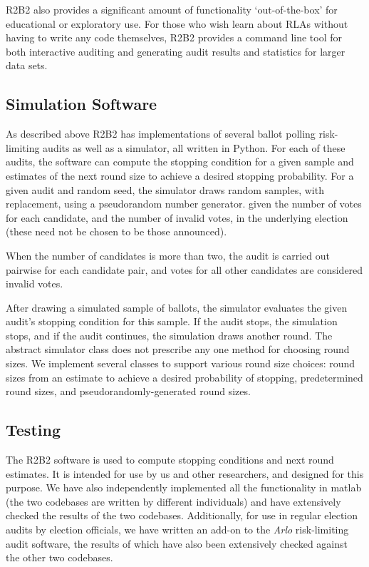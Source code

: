 R2B2 also provides a significant amount of functionality `out-of-the-box' for educational
or exploratory use. For those who wish learn about RLAs without having to write any
code themselves, R2B2 provides a command line tool for both interactive auditing and
generating audit results and statistics for larger data sets.

\subsection{Simulation Software}
As described above R2B2 has implementations of several ballot polling risk-limiting audits as well as a simulator, 
all written in Python.
For each of these audits, the software can compute the stopping condition for a given sample and estimates
of the next round size to achieve a desired stopping probability. 
For a given audit and random seed, the simulator draws random samples, with replacement, using a pseudorandom number generator.
given the number of votes for each candidate, and the number of invalid votes, in the underlying election (these need not be chosen to be those announced). 

When the number of candidates is more than two, the audit is carried out pairwise for each candidate pair, and votes for all other candidates are considered invalid votes. 

After drawing a simulated sample of ballots, the simulator evaluates the given audit's stopping condition for this sample.
If the audit stops, the simulation stops, and if the audit continues, the simulation draws another round. 
The abstract simulator class does not prescribe any one method for choosing round sizes. 
We implement several classes to support various round size choices: 
round sizes from an estimate to achieve a desired probability of stopping, 
predetermined round sizes, and pseudorandomly-generated round sizes. 

\subsection{Testing}

The R2B2 software is used to compute stopping conditions and next round estimates. It is intended for use by us and other researchers, and designed for this purpose. We have also independently implemented all the functionality in matlab \cite{brla_explore_anon} (the two codebases are written by different individuals) and have extensively checked the results of the two codebases. Additionally, for use in regular election audits by election officials, we have written an add-on \cite{athena_anon} to the {\em Arlo} risk-limiting audit software, the results of which have also been extensively checked against the other two codebases. 


